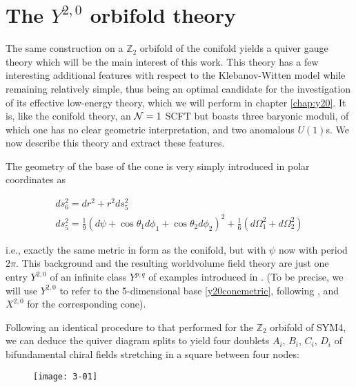 \section{The $Y^{2,0}$ orbifold theory}\label{sec:squares}

The same construction on a $\mathbb{Z}_2$ orbifold of the conifold yields a quiver gauge theory which will be the main interest of this work. This theory has a few interesting additional features with respect to the Klebanov-Witten model while remaining relatively simple, thus being an optimal candidate for the investigation of its effective low-energy theory, which we will perform in chapter \ref{chap:y20}. It is, like the conifold theory, an $\mathcal{N} = 1$ SCFT but boasts three baryonic moduli, of which one has no clear geometric interpretation, and two anomalous $U(1)$s. We now describe this theory and extract these features.

The geometry of the base of the cone is very simply introduced in polar coordinates as 

\begin{gather}
	ds^2_6 = dr^2 + r^2 ds_5^2\nonumber\\
	ds^2_5 = \frac{1}{9} (d\psi + \cos\theta_1 d\phi_1 + \cos\theta_2 d\phi_2)^2 + \frac{1}{6} (d\Omega_1^2 + d\Omega_2^2)\label{y20conemetric}
\end{gather}

i.e., exactly the same metric in form as the conifold, but with $\psi$ now with period $2\pi$. This background and the resulting worldvolume field theory are just one entry $Y^{2,0}$ of an infinite class $Y^{p,q}$ of examples introduced in \cite{benvenutiInfinite}. (To be precise, we will use $Y^{2,0}$ to refer to the 5-dimensional base \eqref{y20conemetric}, following \cite{ytoozero}, and $X^{2,0}$ for the corresponding cone).

Following an identical procedure to that performed for the $\mathbb{Z}_2$ orbifold of SYM4, we can deduce the quiver diagram splits to yield four doublets $A_i$, $B_i$, $C_i$, $D_i$ of bifundamental chiral fields stretching in a square between four nodes:

\begin{figure}[H]
	\centering
\texttt{[image: 3-01]}
\end{figure}

